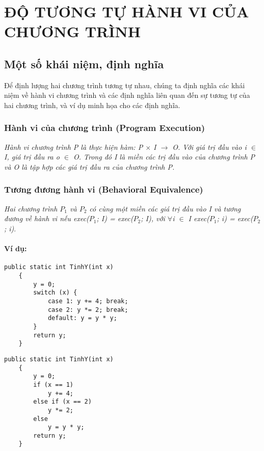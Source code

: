\chapter{ĐỘ TƯƠNG TỰ HÀNH VI CỦA CHƯƠNG TRÌNH}
	
\section{Một số khái niệm, định nghĩa}
	
	Để định lượng hai chương trình tương tự nhau, chúng ta định nghĩa các khái niệm về hành vi chương trình và các định nghĩa liên quan đến sự tương tự của hai chương trình, và ví dụ minh họa cho các định nghĩa. 
	
\subsection{Hành vi của chương trình (Program Execution)}
	\textit{Hành vi chương trình P là thực hiện hàm: P $\times$ I $\rightarrow$ O. Với giá trị đầu vào i $\in$ I, giá trị đầu ra o $\in$ O. Trong đó I là miền các trị đầu vào của chương trình P và O là tập hợp các giá trị đầu ra của chương trình P.}
	
	
\subsection{Tương đương hành vi (Behavioral Equivalence)}
	\textit{Hai chương trình $P_{1}$ và $P_{2}$ có cùng một miền các giá trị đầu vào I và tương đương về hành vi nếu exec($P_{1}$; I) = exec($P_{2}$; I), với $\forall$i $\in$ I exec($P_{1}$; i) = exec($P_{2}$; i)}.
	
	
\subsubsection{Ví dụ:}

	\renewcommand{\lstlistingname}{Chương trình}
	\begin{lstlisting}[language={[Sharp]C}, caption={Tính y, sử dụng hàm switch...case}, label={Script}]
	public static int TinhY(int x)
	{
		y = 0;
		switch (x) {
			case 1: y += 4; break;
			case 2: y *= 2; break;
			default: y = y * y;
		}
		return y;
	}
	\end{lstlisting}
	\renewcommand{\lstlistingname}{Chương trình}
	
	\begin{lstlisting}[language={[Sharp]C}, caption={Tính y, sử dụng hàm If...else}, label={Script}]
	public static int TinhY(int x)
	{
		y = 0;
		if (x == 1)
			y += 4;
		else if (x == 2)
			y *= 2;
		else
			y = y * y;
		return y;
	}
	\end{lstlisting}

